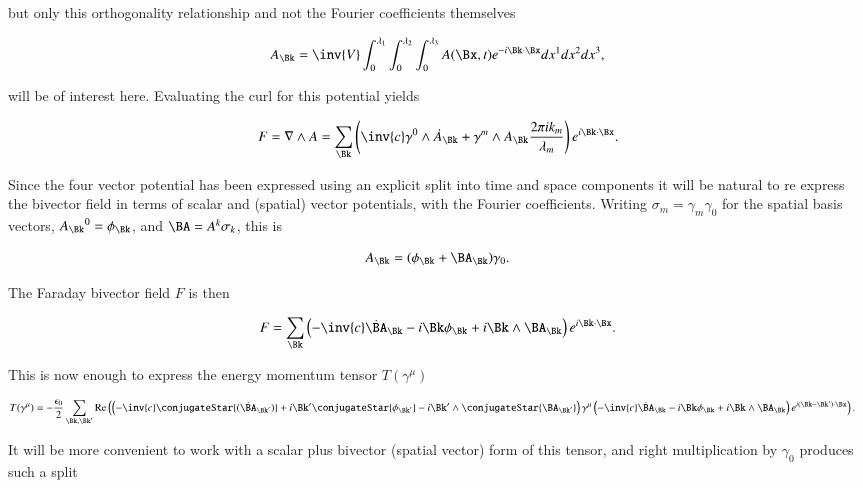 but only this orthogonality relationship and not the Fourier coefficients themselves

\begin{align}
\label{eqn:fourierMaxVac:7}
A_\Bk = 
\inv{ V }
\int_0^{\lambda_1}
\int_0^{\lambda_2}
\int_0^{\lambda_3} A(\Bx, t) e^{- i \Bk \cdot \Bx} dx^1 dx^2 dx^3,
\end{align}

will be of interest here.  Evaluating the curl for this potential yields

\begin{align}\label{eqn:fourierMaxVac:8}
F = \grad \wedge A
= \sum_{\Bk} \left( \inv{c} \gamma^0 \wedge \dot{A}_\Bk + \gamma^m \wedge A_\Bk \frac{2 \pi i k_m}{\lambda_m} \right) e^{i \Bk \cdot \Bx}.
\end{align}

Since the four vector potential has been expressed using an explicit split into time and space components it will be natural to re express the bivector field in terms of scalar and (spatial) vector potentials, with the Fourier coefficients.  Writing $\sigma_m = \gamma_m \gamma_0$ for the spatial basis vectors, ${A_\Bk}^0 = \phi_\Bk$, and $\BA = A^k \sigma_k$, this is

\begin{align}\label{eqn:fourierMaxVac:71}
A_\Bk = (\phi_\Bk + \BA_\Bk) \gamma_0.
\end{align}

The Faraday bivector field $F$ is then

\begin{align}\label{eqn:fourierMaxVac:72}
F = \sum_\Bk \left( -\inv{c} \dot{\BA}_\Bk - i \Bk \phi_\Bk + i \Bk \wedge \BA_\Bk \right) e^{i \Bk \cdot \Bx}.
\end{align}

This is now enough to express the energy momentum tensor $T(\gamma^\mu)$

\begin{align}\label{eqn:fourierMaxVac:73}
T(\gamma^\mu) 
&= -\frac{\epsilon_0}{2} \sum_{\Bk,\Bk'}
\Real \left(
\left( -\inv{c} \conjugateStar{(\dot{\BA}_{\Bk'})} + i \Bk' \conjugateStar{\phi_{\Bk'}} - i \Bk' \wedge \conjugateStar{\BA_{\Bk'}} \right) 
\gamma^\mu 
\left( -\inv{c} \dot{\BA}_\Bk - i \Bk \phi_\Bk + i \Bk \wedge \BA_\Bk \right) e^{i (\Bk -\Bk') \cdot \Bx}
\right).
\end{align}

It will be more convenient to work with a scalar plus bivector (spatial vector) form of this tensor, and right multiplication by $\gamma_0$ produces such a split

